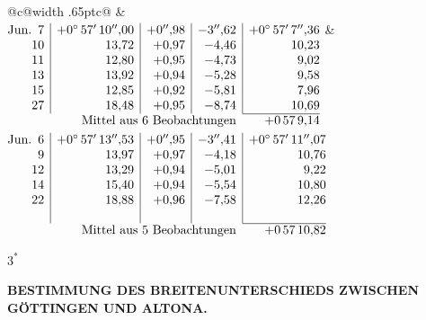 \noindent\begin{tabular}{@{}c@{\hspace{.4em}\vrule width .65pt\hspace{.4em}}c@{}}
 &
 \\[.18ex]
\(\begin{array}[t]{@{}r|r|r|r|r@{}}
\text{Jun.}\enspace 7 & +0^\circ\,57'\,10''{,}00 & +0''{,}98 & -3''{,}62 & +0^\circ\,57'\,7''{,}36\\
10 & 13{,}72 & +0{,}97 & -4{,}46 & 10{,}23\\
11 & 12{,}80 & +0{,}95 & -4{,}73 & 9{,}02\\
13 & 13{,}92 & +0{,}94 & -5{,}28 & 9{,}58\\
15 & 12{,}85 & +0{,}92 & -5{,}81 & 7{,}96\\
27 & 18{,}48 & +0{,}95 & -8{,}74 & 10{,}69\\
\cline{5-5}
\multicolumn{4}{r}{\text{Mittel aus 6 Beobachtungen}} & +0\,57\,9{,}14
\end{array}\)
&
\(\begin{array}[t]{@{}r|r|r|r|r@{}}
\text{Jun.}\enspace 6 & +0^\circ\,57'\,13''{,}53 & +0''{,}95 & -3''{,}41 & +0^\circ\,57'\,11''{,}07\\
9 & 13{,}97 & +0{,}97 & -4{,}18 & 10{,}76\\
12 & 13{,}29 & +0{,}94 & -5{,}01 & 9{,}22\\
14 & 15{,}40 & +0{,}94 & -5{,}54 & 10{,}80\\
22 & 18{,}88 & +0{,}96 & -7{,}58 & 12{,}26\\
 & & & & \\
\cline{5-5}
\multicolumn{4}{r}{\text{Mittel aus 5 Beobachtungen}} & +0\,57\,10{,}82
\end{array}\)
\end{tabular}\par\medskip
\noindent\hfill \(3^{*}\)\hspace{.12\textwidth}\par

\par\clearpage
\noindent{}\parbox[t]{\dimexpr\linewidth-24mm\relax}{\centering\scriptsize\bfseries BESTIMMUNG DES BREITENUNTERSCHIEDS ZWISCHEN GÖTTINGEN UND ALTONA.}\makebox[12mm][r]{}\par\medskip

